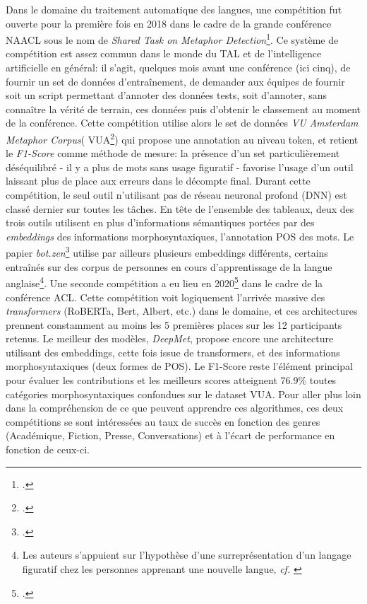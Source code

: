 Dans le domaine du traitement automatique des langues, une compétition fut ouverte pour la première fois en 2018 dans le cadre de la grande conférence NAACL sous le nom de \textit{Shared Task on Metaphor Detection}\footcite{leong_report_2018}. Ce système de compétition est assez commun dans le monde du TAL et de l'intelligence artificielle en général: il s'agit, quelques mois avant une conférence (ici cinq), de fournir un set de données d'entraînement, de demander aux équipes de fournir soit un script permettant d'annoter des données tests, soit d'annoter, sans connaître la vérité de terrain, ces données puis d'obtenir le classement au moment de la conférence. Cette compétition utilise alors le set de données \textit{VU Amsterdam Metaphor Corpus}( VUA\footcite{steen_method_2010}) qui propose une annotation au niveau token, et retient le \textit{F1-Score} comme méthode de mesure: la présence d'un set particulièrement déséquilibré - il y a plus de mots sans usage figuratif - favorise l'usage d'un outil laissant plus de place aux erreurs dans le décompte final. Durant cette compétition, le seul outil n'utilisant pas de réseau neuronal profond (DNN) est classé dernier sur toutes les tâches. En tête de l'ensemble des tableaux, deux des trois outils utilisent en plus d'informations sémantiques portées par des \textit{embeddings} des informations morphosyntaxiques, l'annotation POS des mots. Le papier \textit{bot.zen}\footcite{stemle_using_2018} utilise par ailleurs plusieurs embeddings différents, certains entraînés sur des corpus de personnes en cours d'apprentissage de la langue anglaise\footnote{Les auteurs s'appuient sur l'hypothèse d'une surreprésentation d'un langage figuratif chez les personnes apprenant une nouvelle langue, \textit{cf.} \cite{klebanov_argumentation-relevant_2013}}. Une seconde compétition a eu lieu en 2020\footcite{leong_report_2020} dans le cadre de la conférence ACL. Cette compétition voit logiquement l'arrivée massive des \textit{transformers} (RoBERTa, Bert, Albert, etc.) dans le domaine, et ces architectures prennent constamment au moins les 5 premières places sur les 12 participants retenus. Le meilleur des modèles, \textit{DeepMet}, propose encore une architecture utilisant des embeddings, cette fois issue de transformers, et des informations morphosyntaxiques (deux formes de POS). Le F1-Score reste l'élément principal pour évaluer les contributions et les meilleurs scores atteignent 76.9\% toutes catégories morphosyntaxiques confondues sur le dataset VUA. Pour aller plus loin dans la compréhension de ce que peuvent apprendre ces algorithmes, ces deux compétitions se sont intéressées au taux de succès en fonction des genres (Académique, Fiction, Presse, Conversations) et à l'écart de performance en fonction de ceux-ci. %

